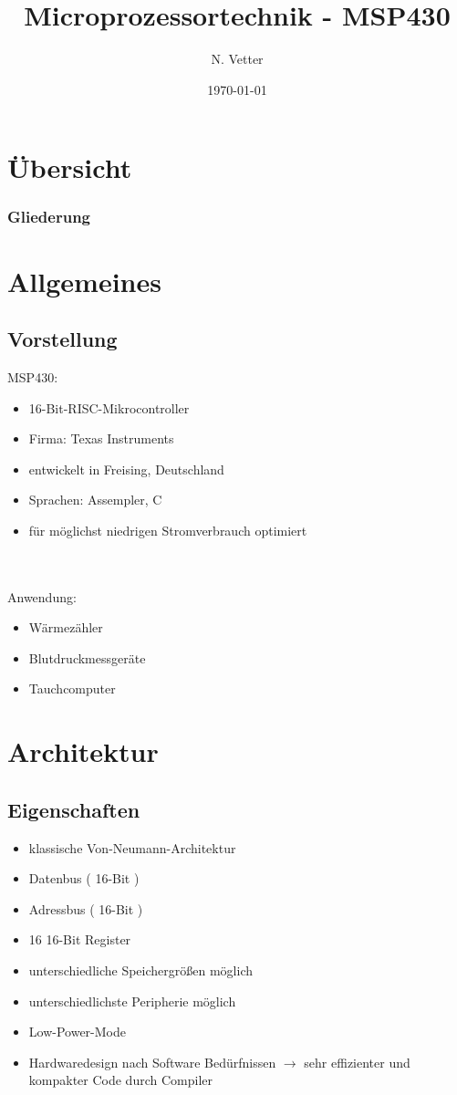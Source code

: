 \documentclass{beamer}
\title{Microprozessortechnik - MSP430}
\author{N. Vetter}
\date{\today}
\institute[Universität Potsdam]{
	Institut für Informatik
}
\begin{document}
\begin{frame}

\titlepage

\end{frame}

\section{Übersicht}
\begin{frame}
\frametitle{Gliederung}
\begin{multicols}{2}
\tableofcontents
\end{multicols}
\end{frame}

\section{Allgemeines}
\subsection{Vorstellung}
\begin{frame}
MSP430:
\begin{itemize}
\item 16-Bit-RISC-Mikrocontroller
\item Firma: Texas Instruments
\item entwickelt in Freising, Deutschland
\item Sprachen: Assempler, C
\item für möglichst niedrigen Stromverbrauch optimiert
\end{itemize}
\ \\
\ \\
Anwendung:
\begin{itemize}
\item Wärmezähler
\item Blutdruckmessgeräte
\item Tauchcomputer
\end{itemize}
\end{frame}
\section{Architektur}
\subsection{Eigenschaften}
\begin{frame}
\begin{itemize}
\item klassische Von-Neumann-Architektur
\item Datenbus ( 16-Bit )
\item Adressbus ( 16-Bit )
\item 16 16-Bit Register
\item unterschiedliche Speichergrößen möglich
\item unterschiedlichste Peripherie möglich
\item Low-Power-Mode
\item Hardwaredesign nach Software Bedürfnissen $\rightarrow$ sehr effizienter und kompakter Code durch Compiler
\end{itemize}
\end{frame}
\end{document}

